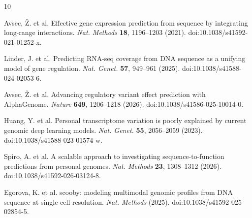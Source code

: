 \documentclass[pdflatex,sn-nature]{sn-jnl}
\begin{document}
\begin{thebibliography}{10}

Avsec, \v{Z}. et al. Effective gene expression prediction from sequence by integrating long-range interactions. \textit{Nat. Methods} \textbf{18}, 1196--1203 (2021). doi:10.1038/s41592-021-01252-x.

Linder, J. et al. Predicting RNA-seq coverage from DNA sequence as a unifying model of gene regulation. \textit{Nat. Genet.} \textbf{57}, 949--961 (2025). doi:10.1038/s41588-024-02053-6.

Avsec, \v{Z}. et al. Advancing regulatory variant effect prediction with AlphaGenome. \textit{Nature} \textbf{649}, 1206--1218 (2026). doi:10.1038/s41586-025-10014-0.

Huang, Y. et al. Personal transcriptome variation is poorly explained by current genomic deep learning models. \textit{Nat. Genet.} \textbf{55}, 2056--2059 (2023). doi:10.1038/s41588-023-01574-w.

Spiro, A. et al. A scalable approach to investigating sequence-to-function predictions from personal genomes. \textit{Nat. Methods} \textbf{23}, 1308--1312 (2026). doi:10.1038/s41592-026-03124-8.

Egorova, K. et al. scooby: modeling multimodal genomic profiles from DNA sequence at single-cell resolution. \textit{Nat. Methods} (2025). doi:10.1038/s41592-025-02854-5.

\end{thebibliography}
\end{document}
